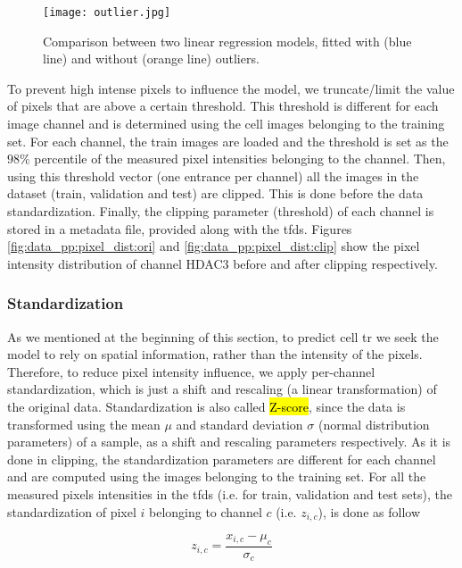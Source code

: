 \begin{figure}[htb]
  \centering
  \texttt{[image: outlier.jpg]}
  \caption{Comparison between two linear regression models, fitted with (blue line) and without (orange line) outliers.}
  \label{fig:data_pp:outlier}
\end{figure}

To prevent high intense pixels to influence the model, we truncate/limit the value of pixels that are above a certain threshold. This threshold is different for each image channel and is determined using the cell images belonging to the training set. For each channel, the train images are loaded and the threshold is set as the $98\%$ percentile of the measured pixel intensities belonging to the channel. Then, using this threshold vector (one entrance per channel) all the images in the dataset (train, validation and test) are clipped. This is done before the data standardization. Finally, the clipping parameter (threshold) of each channel is stored in a metadata file, provided along with the \gls{tfds}. Figures \ref{fig:data_pp:pixel_dist:ori} and \ref{fig:data_pp:pixel_dist:clip} show the pixel intensity distribution of channel HDAC3 before and after clipping respectively.

\subsubsection{Standardization}

As we mentioned at the beginning of this section, to predict cell \gls{tr} we seek the model to rely on spatial information, rather than the intensity of the pixels. Therefore, to reduce pixel intensity influence, we apply per-channel standardization, which is just a shift and rescaling (a linear transformation) of the original data. Standardization is also called \hl{Z-score}, since the data is transformed using the mean $\mu$ and standard deviation $\sigma$ (normal distribution parameters) of a sample, as a shift and rescaling parameters respectively. As it is done in clipping, the standardization parameters are different for each channel and are computed using the images belonging to the training set. For all the measured pixels intensities in the \gls{tfds} (i.e. for train, validation and test sets), the standardization of pixel $i$ belonging to channel $c$ (i.e. $z_{i,c}$), is done as follow

\begin{equation}
  z_{i,c} = \frac{x_{i,c} - \mu_c}{\sigma_c}
  \label{eq:data_pp:z-score}
\end{equation}

